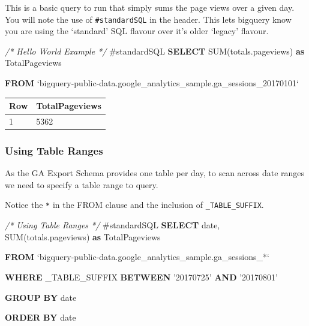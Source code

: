 \documentclass[]{book}
\newenvironment{Shaded}{\begin{snugshade}}{\end{snugshade}}
\newcommand{\CommentTok}[1]{\textcolor[rgb]{0.56,0.35,0.01}{\textit{#1}}}
\newcommand{\DataTypeTok}[1]{\textcolor[rgb]{0.13,0.29,0.53}{#1}}
\newcommand{\FunctionTok}[1]{\textcolor[rgb]{0.00,0.00,0.00}{#1}}
\newcommand{\KeywordTok}[1]{\textcolor[rgb]{0.13,0.29,0.53}{\textbf{#1}}}
\newcommand{\NormalTok}[1]{#1}
\newcommand{\StringTok}[1]{\textcolor[rgb]{0.31,0.60,0.02}{#1}}
\begin{document}
This is a basic query to run that simply sums the page views over a given day.
You will note the use of \texttt{\#standardSQL} in the header. This lets bigquery know
you are using the `standard' SQL flavour over it's older `legacy' flavour.

\begin{Shaded}
\begin{Highlighting}[]
\CommentTok{/* Hello World Example */}
\NormalTok{#standardSQL}
\KeywordTok{SELECT} \FunctionTok{SUM}\NormalTok{(totals.pageviews) }\KeywordTok{as}\NormalTok{ TotalPageviews}
    
\KeywordTok{FROM}\NormalTok{ `bigquery-public-data.google_analytics_sample.ga_sessions_20170101`}
\end{Highlighting}
\end{Shaded}

\begin{longtable}[]{@{}ll@{}}
\toprule
Row & TotalPageviews\tabularnewline
\midrule
\endhead
1 & 5362\tabularnewline
\bottomrule
\end{longtable}

\hypertarget{using-table-ranges}{%
\subsubsection{Using Table Ranges}\label{using-table-ranges}}

As the GA Export Schema provides one table per day, to scan across date ranges we need to specify a table range to query.

Notice the \texttt{*} in the FROM clause and the inclusion of \texttt{\_TABLE\_SUFFIX}.

\begin{Shaded}
\begin{Highlighting}[]
\CommentTok{/* Using Table Ranges */}
\NormalTok{#standardSQL}
\KeywordTok{SELECT}  \DataTypeTok{date}\NormalTok{, }
        \FunctionTok{SUM}\NormalTok{(totals.pageviews) }\KeywordTok{as}\NormalTok{ TotalPageviews}

\KeywordTok{FROM}\NormalTok{  `bigquery-public-data.google_analytics_sample.ga_sessions_*`}

\KeywordTok{WHERE}\NormalTok{ _TABLE_SUFFIX }\KeywordTok{BETWEEN} \StringTok{'20170725'} \KeywordTok{AND} \StringTok{'20170801'}

\KeywordTok{GROUP} \KeywordTok{BY} \DataTypeTok{date}

\KeywordTok{ORDER} \KeywordTok{BY} \DataTypeTok{date}
\end{Highlighting}
\end{Shaded}
\end{document}
